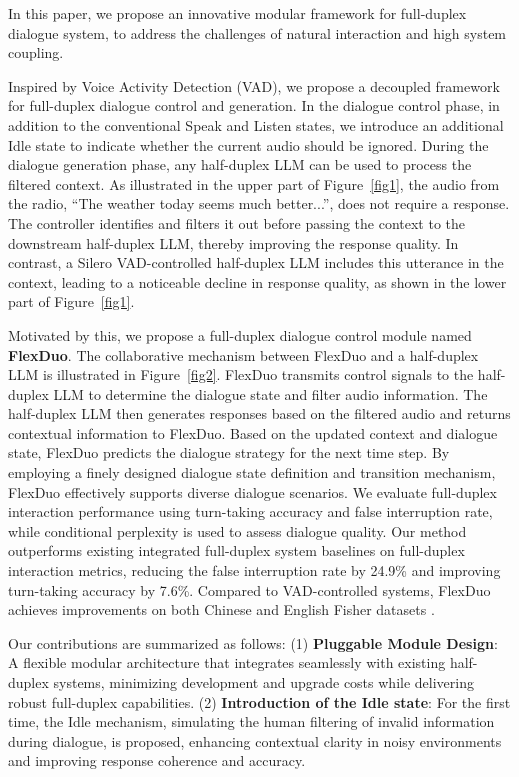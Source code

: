 \documentclass[11pt]{article}
\begin{document}
In this paper, we propose an innovative modular framework for full-duplex dialogue system, to address the challenges of natural interaction and high system coupling.

Inspired by Voice Activity Detection (VAD), we propose a decoupled framework for full-duplex dialogue control and generation. In the dialogue control phase, in addition to the conventional Speak and Listen states, we introduce an additional Idle state to indicate whether the current audio should be ignored. During the dialogue generation phase, any half-duplex LLM can be used to process the filtered context. As illustrated in the upper part of Figure~\ref{fig1}, the audio from the radio, ``The weather today seems much better...'', does not require a response. The controller identifies and filters it out before passing the context to the downstream half-duplex LLM, thereby improving the response quality. In contrast, a Silero VAD-controlled \cite{silero2021vad} half-duplex LLM includes this utterance in the context, leading to a noticeable decline in response quality, as shown in the lower part of Figure~\ref{fig1}.

Motivated by this, we propose a full-duplex dialogue control module named \textbf{FlexDuo}. The collaborative mechanism between FlexDuo and a half-duplex LLM is illustrated in Figure~\ref{fig2}. FlexDuo transmits control signals to the half-duplex LLM to determine the dialogue state and filter audio information. The half-duplex LLM then generates responses based on the filtered audio and returns contextual information to FlexDuo. Based on the updated context and dialogue state, FlexDuo predicts the dialogue strategy for the next time step. By employing a finely designed dialogue state definition and transition mechanism, FlexDuo effectively supports diverse dialogue scenarios. We evaluate full-duplex interaction performance using turn-taking accuracy and false interruption rate, while conditional perplexity is used to assess dialogue quality. Our method outperforms existing integrated full-duplex system baselines on full-duplex interaction metrics, reducing the false interruption rate by 24.9\% and improving turn-taking accuracy by 7.6\%. Compared to VAD-controlled systems, FlexDuo achieves improvements on both Chinese and English Fisher datasets \cite{cieri2004fisher}.

\noindent Our contributions are summarized as follows:
(1) \textbf{Pluggable Module Design}: A flexible modular architecture that integrates seamlessly with existing half-duplex systems, minimizing development and upgrade costs while delivering robust full-duplex capabilities. 
(2) \textbf{Introduction of the Idle state}: For the first time, the Idle mechanism, simulating the human filtering of invalid information during dialogue, is proposed, enhancing contextual clarity in noisy environments and improving response coherence and accuracy.
\end{document}
